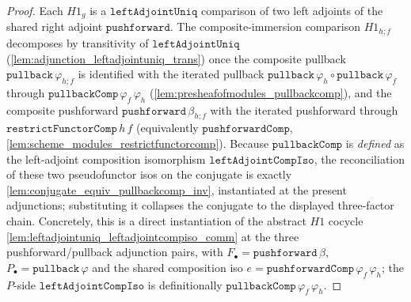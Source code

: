 \begin{proof}
  \leanok
  Each \(H1_g\) is a \(\mathtt{leftAdjointUniq}\) comparison of two left adjoints of the shared right
  adjoint \(\mathtt{pushforward}\). The composite-immersion comparison \(H1_{h \mathbin{;} f}\)
  decomposes by transitivity of \(\mathtt{leftAdjointUniq}\)
  (\cref{lem:adjunction_leftadjointuniq_trans}) once the composite pullback
  \(\mathtt{pullback}\,\varphi_{h \mathbin{;} f}\) is identified with the iterated pullback
  \(\mathtt{pullback}\,\varphi_h \circ \mathtt{pullback}\,\varphi_f\) through
  \(\mathtt{pullbackComp}\,\varphi_f\,\varphi_h\) (\cref{lem:presheafofmodules_pullbackcomp}), and the
  composite pushforward \(\mathtt{pushforward}\,\beta_{h \mathbin{;} f}\) with the iterated pushforward
  through \(\mathtt{restrictFunctorComp}\,h\,f\) (equivalently \(\mathtt{pushforwardComp}\),
  \cref{lem:scheme_modules_restrictfunctorcomp}). Because \(\mathtt{pullbackComp}\) is \emph{defined} as
  the left-adjoint composition isomorphism \(\mathtt{leftAdjointCompIso}\), the reconciliation of these
  two pseudofunctor isos on the conjugate is exactly \cref{lem:conjugate_equiv_pullbackcomp_inv},
  instantiated at the present adjunctions; substituting it collapses the conjugate to the displayed
  three-factor chain. Concretely, this is a direct instantiation of the abstract \(H1\) cocycle
  \cref{lem:leftadjointuniq_leftadjointcompiso_comm} at the three pushforward/pullback adjunction pairs,
  with \(F_\bullet = \mathtt{pushforward}\,\beta\), \(P_\bullet = \mathtt{pullback}\,\varphi\) and the
  shared composition iso \(e = \mathtt{pushforwardComp}\,\varphi_f\,\varphi_h\); the \(P\)-side
  \(\mathtt{leftAdjointCompIso}\) is definitionally \(\mathtt{pullbackComp}\,\varphi_f\,\varphi_h\).
\end{proof}


